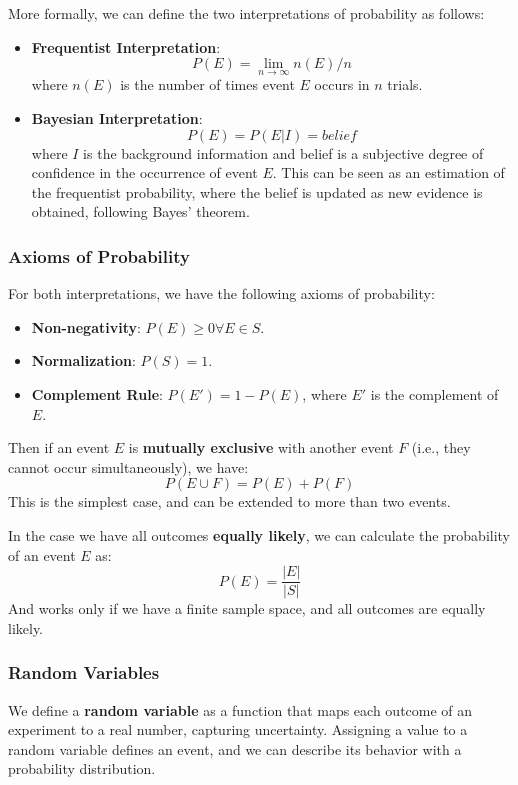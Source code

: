 More formally, we can define the two interpretations of probability as follows:
\begin{itemize}
    \item \textbf{Frequentist Interpretation}: \[ P(E) = \lim_{n \to \infty} n(E)/n \]
    where $n(E)$ is the number of times event $E$ occurs in $n$ trials.
    \item \textbf{Bayesian Interpretation}: \[ P(E) = P(E | I) = belief\]
    where $I$ is the background information and belief is a subjective degree of confidence in the occurrence of event $E$.
    This can be seen as an estimation of the frequentist probability, where the belief is updated as new evidence is obtained, following Bayes' theorem.
\end{itemize}

\subsubsection{Axioms of Probability}
For both interpretations, we have the following axioms of probability:
\begin{itemize}
    \item \textbf{Non-negativity}: $P(E) \geq 0 \forall E \in S$.
    \item \textbf{Normalization}: $P(S) = 1$.
    \item \textbf{Complement Rule}: $P(E') = 1 - P(E)$, where $E'$ is the complement of $E$.
\end{itemize}

Then if an event $E$ is \textbf{mutually exclusive} with another event $F$ (i.e., they cannot occur simultaneously), we have:
\begin{equation}
    P(E \cup F) = P(E) + P(F)
\end{equation}
This is the simplest case, and can be extended to more than two events.

In the case we have all outcomes \textbf{equally likely}, we can calculate the probability of an event $E$ as:
\begin{equation}
    P(E) = \frac{|E|}{|S|}
\end{equation}
And works only if we have a finite sample space, and all outcomes are equally likely.

\subsubsection{Random Variables}
We define a \textbf{random variable} as a function that maps each outcome of an experiment to a real number, capturing uncertainty.
Assigning a value to a random variable defines an event, and we can describe its behavior with a probability distribution.

